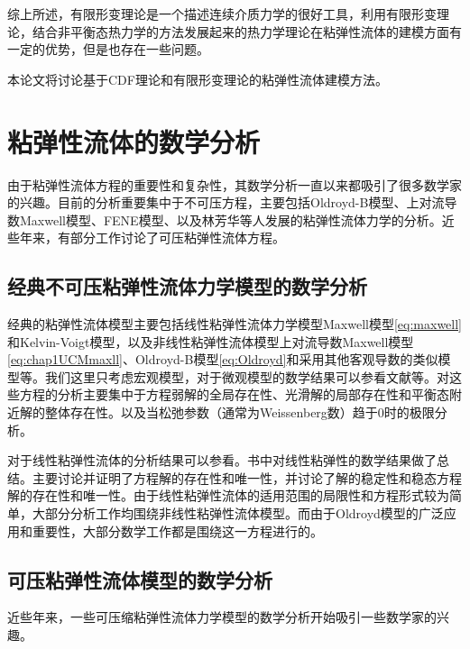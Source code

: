 \documentclass{article}
\begin{document}
综上所述，有限形变理论是一个描述连续介质力学的很好工具，利用有限形变理论，结合非平衡态热力学的方法发展起来的热力学理论在粘弹性流体的建模方面有一定的优势，但是也存在一些问题。

本论文将讨论基于CDF理论和有限形变理论的粘弹性流体建模方法。

\section{粘弹性流体的数学分析}
由于粘弹性流体方程的重要性和复杂性，其数学分析一直以来都吸引了很多数学家的兴趣\cite{lin2012some,li2007mathematical,weinan2002convergence,fabrizio1992mathematical,renardy2008mathematical,joseph1987hyperbolicity,guillope2010regular,saut2012lectures,yong2014newtonian,qian2010well,hu2011global,lei2005global,fang2014incompressible}。目前的分析重要集中于不可压方程，主要包括Oldroyd-B模型、上对流导数Maxwell模型、FENE模型、以及林芳华等人发展的粘弹性流体力学的分析\cite{elgindi2015global,saut2012lectures,renardy2000mathematical,masmoudi2011global,lions2000global,masmoudi2008well,lei2010remarks}。近些年来，有部分工作讨论了可压粘弹性流体方程\cite{fang2014incompressible,hu2012strong,qian2010global,qian2011initial}。
\subsection{经典不可压粘弹性流体力学模型的数学分析}
经典的粘弹性流体模型主要包括线性粘弹性流体力学模型Maxwell模型\eqref{eq:maxwell}和Kelvin-Voigt模型，以及非线性粘弹性流体模型上对流导数Maxwell模型\eqref{eq:chap1UCMmaxll}、Oldroyd-B模型\eqref{eq:Oldroyd}和采用其他客观导数的类似模型等。我们这里只考虑宏观模型，对于微观模型的数学结果可以参看文献\cite{masmoudi2013global,masmoudi2008well,li2007mathematical,li2004local,li2004well,lions2007global}等。对这些方程的分析主要集中于方程弱解的全局存在性、光滑解的局部存在性和平衡态附近解的整体存在性。以及当松弛参数（通常为Weissenberg数）趋于$0$时的极限分析。

对于线性粘弹性流体的分析结果可以参看\cite{fabrizio1992mathematical,renardy2000mathematical}。书中对线性粘弹性的数学结果做了总结。主要讨论并证明了方程解的存在性和唯一性，并讨论了解的稳定性和稳态方程解的存在性和唯一性。由于线性粘弹性流体的适用范围的局限性和方程形式较为简单，大部分分析工作均围绕非线性粘弹性流体模型。而由于Oldroyd模型的广泛应用和重要性，大部分数学工作都是围绕这一方程进行的。






\subsection{可压粘弹性流体模型的数学分析}
近些年来，一些可压缩粘弹性流体力学模型的数学分析开始吸引一些数学家的兴趣。
\end{document}
